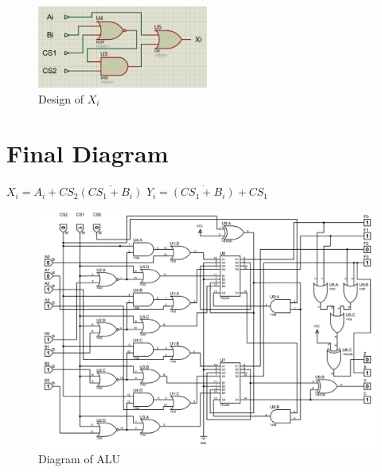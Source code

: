 \documentclass[]{article}
\begin{document}
	\begin{figure}[h!]
		\centering
		\includegraphics[width = 0.5\textwidth]{Xi.PNG}
		\caption{Design of $X_i$ \newline
		}
		\label{fig:ckt2}
		
	\end{figure}

	\section{Final Diagram}
	$X_i=A_i+CS_2\overline{(CS_1+B_i)}$
	\newline
	\newline
    $Y_i = \overline{(CS_1+B_i)}+CS_1$
    \begin{figure}[h!]
		\centering
		\includegraphics[width = 1\textwidth]{Total.png}
		\caption{Diagram of ALU \newline
		}
		\label{fig:ckt3}
		
	\end{figure}
	
	
\end{document}
